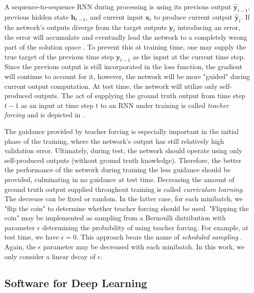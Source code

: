 A sequence-to-sequence \ac{RNN} during processing is using its previous output $\hat{\pmb{y}}_{t-1}$, previous hidden state $\pmb{h}_{t-1}$, and current input $\pmb{x}_t$ to produce current output $\hat{\pmb{y}}_t$. If the network's outputs diverge from the target outputs $\pmb{y}_t$ introducing an error, the error will accumulate and eventually lead the network to a completely wrong part of the solution space \cite{Goodfellow-et-al-2016}. To prevent this at training time, one may supply the true target of the previous time step $\pmb{y}_{t-1}$ as the input at the current time step. Since the previous output is still incorporated in the loss function, the gradient will continue to account for it, however, the network will be more "guided" during current output computation. At test time, the network will utilize only self-produced outputs. The act of supplying the ground truth output from time step $t-1$ as an input at time step $t$ to an \ac{RNN} under training is called \emph{teacher forcing} \cite{Goodfellow-et-al-2016} and is depicted in .

The guidance provided by teacher forcing is especially important in the initial phase of the training, where the network's output has still relatively high validation error. Ultimately, during test, the network should operate using only self-produced outputs (without ground truth knowledge). Therefore, the better the performance of the network during training the less guidance should be provided, culminating in no guidance at test time. Decreasing the amount of ground truth output supplied throughout training is called \emph{curriculum learning}. The decrease can be fixed or random. In the latter case, for each minibatch, we "flip the coin" to determine whether teacher forcing should be used. "Flipping the coin" may be implemented as sampling from a Bernoulli distribution with parameter $\epsilon$ determining the probability of using teacher forcing. For example, at test time, we have $\epsilon=0$. This approach bears the name of \emph{scheduled sampling} \cite{Bengio2015}. Again, the $\epsilon$ parameter may be decreased with each minibatch. In this work, we only consider a linear decay of $\epsilon$.

\subsection{Software for Deep Learning}

